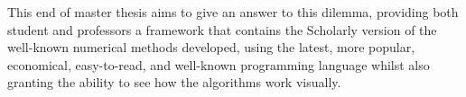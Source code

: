 This end of master thesis aims to give an answer to this dilemma, providing both student and professors a framework that contains the Scholarly version of the well-known numerical methods developed, using the latest, more popular, economical, easy-to-read, and well-known programming language whilst also granting the ability to see how the algorithms work visually.  
